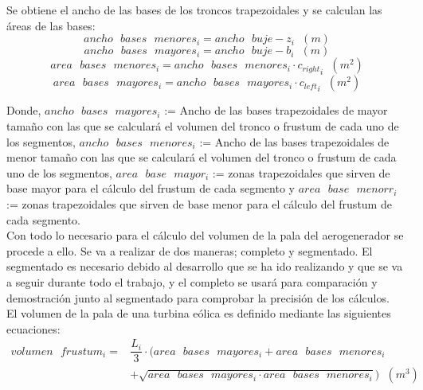 Se obtiene el ancho de las bases de los troncos trapezoidales y se calculan las áreas de las bases:
\begin{equation}
 ancho \text{ } bases \text{ } menores_i = ancho \text{ } buje - z_i \hspace{7pt} (m)
 \end{equation}
 \begin{equation}
 ancho \text{ } bases \text{ } mayores_i = ancho \text{ } buje - b_i \hspace{7pt} (m)
\end{equation}
\begin{equation}
 area \text{ } bases \text{ } menores_i = ancho \text{ } bases \text{ } menores_i \cdot {c_{right}}_i \hspace{7pt} (m^2)
 \end{equation}
\begin{equation}
 area \text{ } bases \text{ } mayores_i = ancho \text{ } bases \text{ } mayores_i \cdot {c_{left}}_i \hspace{7pt} (m^2)
\end{equation}

Donde, $ancho \text{ } bases \text{ } mayores_i$ := Ancho de las bases trapezoidales de mayor tamaño con las que se calculará el volumen del tronco o frustum de cada uno de los segmentos,  $ancho \text{ } bases \text{ } menores_i$ := Ancho de las bases trapezoidales de menor tamaño con las que se calculará el volumen del tronco o frustum de cada uno de los segmentos, $ area \text{ } base \text{ } mayor_i $ := zonas trapezoidales que sirven de base mayor para el cálculo del frustum de cada segmento y $ area \text{ } base \text{ } menorr_i $ := zonas trapezoidales que sirven de base menor para el cálculo del frustum de cada segmento.\\


Con todo lo necesario para el cálculo del volumen de la pala del aerogenerador se procede a ello. Se va a realizar de dos maneras; completo y segmentado. El segmentado es necesario debido al desarrollo que se ha ido realizando y que se va a seguir durante todo el trabajo, y el completo se usará para comparación y demostración junto al segmentado para comprobar la precisión de los cálculos.\\

El volumen de la pala de una turbina eólica es definido mediante las siguientes ecuaciones:
\begin{equation}
    \begin{split}
        volumen \text{ } frustum_i = & \dfrac{L_i}{3} \cdot (area \text{ } bases \text{ } mayores_i + area \text{ } bases \text{ } menores_i \\
        & + \sqrt{area \text{ } bases \text{ } mayores_i \cdot area \text{ } bases \text{ } menores_i}) \hspace{7pt} (m^3)
    \end{split}
\end{equation}

